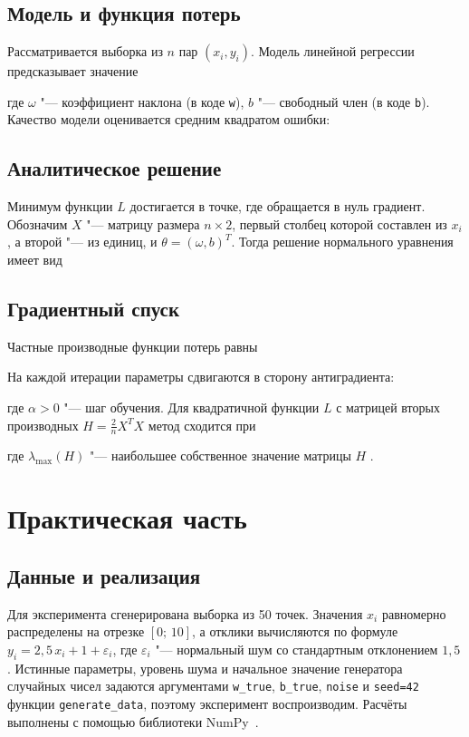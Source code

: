 \documentclass[coursework]{SCWorks}
\begin{document}
\subsection{Модель и функция потерь}
Рассматривается выборка из $n$ пар $(x_i, y_i)$. Модель линейной регрессии предсказывает значение

где $\omega$ "--- коэффициент наклона (в коде \texttt{w}), $b$ "--- свободный член (в коде
\texttt{b}). Качество модели оценивается средним квадратом ошибки:

\subsection{Аналитическое решение}
Минимум функции $L$ достигается в точке, где обращается в нуль градиент.
Обозначим $X$ "--- матрицу размера $n \times 2$, первый столбец которой составлен
из $x_i$, а второй "--- из единиц, и $\theta = (\omega, b)^T$. Тогда решение нормального
уравнения имеет вид

\subsection{Градиентный спуск}
Частные производные функции потерь равны

На каждой итерации параметры сдвигаются в сторону антиградиента:

где $\alpha > 0$ "--- шаг обучения. Для квадратичной функции $L$ с матрицей
вторых производных $H = \frac{2}{n}X^T X$ метод сходится при

где $\lambda_{\max}(H)$ "--- наибольшее собственное значение матрицы $H$ \cite{DeepLearning}.

\section{Практическая часть}

\subsection{Данные и реализация}

Для эксперимента сгенерирована выборка из 50 точек. Значения $x_i$ равномерно распределены на отрезке $[0;\,10]$, а отклики вычисляются по формуле $y_i = 2{,}5\,x_i + 1 + \varepsilon_i$, где $\varepsilon_i$ "--- нормальный шум со стандартным отклонением $1{,}5$. Истинные параметры, уровень шума и начальное значение генератора случайных чисел задаются аргументами \texttt{w\_true}, \texttt{b\_true}, \texttt{noise} и \texttt{seed=42} функции \texttt{generate_data}, поэтому эксперимент воспроизводим. Расчёты выполнены с помощью библиотеки NumPy~\cite{numpy}.
\end{document}
